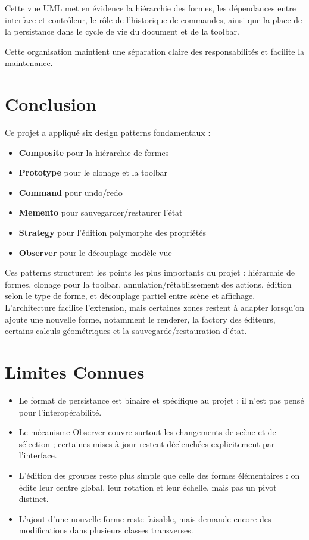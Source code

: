 \documentclass[11pt,a4paper,french]{article}
\begin{document}
\noindent Cette vue UML met en évidence la hiérarchie des formes, les dépendances entre interface et contrôleur, le rôle de l'historique de commandes, ainsi que la place de la persistance dans le cycle de vie du document et de la toolbar.

Cette organisation maintient une séparation claire des responsabilités et facilite la maintenance.

\section{Conclusion}

Ce projet a appliqué six design patterns fondamentaux :

\begin{itemize}
  \item \textbf{Composite} pour la hiérarchie de formes
  \item \textbf{Prototype} pour le clonage et la toolbar
  \item \textbf{Command} pour undo/redo
  \item \textbf{Memento} pour sauvegarder/restaurer l'état
  \item \textbf{Strategy} pour l'édition polymorphe des propriétés
  \item \textbf{Observer} pour le découplage modèle-vue
\end{itemize}

Ces patterns structurent les points les plus importants du projet : hiérarchie de formes, clonage pour la toolbar, annulation/rétablissement des actions, édition selon le type de forme, et découplage partiel entre scène et affichage. L'architecture facilite l'extension, mais certaines zones restent à adapter lorsqu'on ajoute une nouvelle forme, notamment le renderer, la factory des éditeurs, certains calculs géométriques et la sauvegarde/restauration d'état.

\section{Limites Connues}

\begin{itemize}
  \item Le format de persistance est binaire et spécifique au projet ; il n'est pas pensé pour l'interopérabilité.
  \item Le mécanisme Observer couvre surtout les changements de scène et de sélection ; certaines mises à jour restent déclenchées explicitement par l'interface.
  \item L'édition des groupes reste plus simple que celle des formes élémentaires : on édite leur centre global, leur rotation et leur échelle, mais pas un pivot distinct.
  \item L'ajout d'une nouvelle forme reste faisable, mais demande encore des modifications dans plusieurs classes transverses.
\end{itemize}
\end{document}
